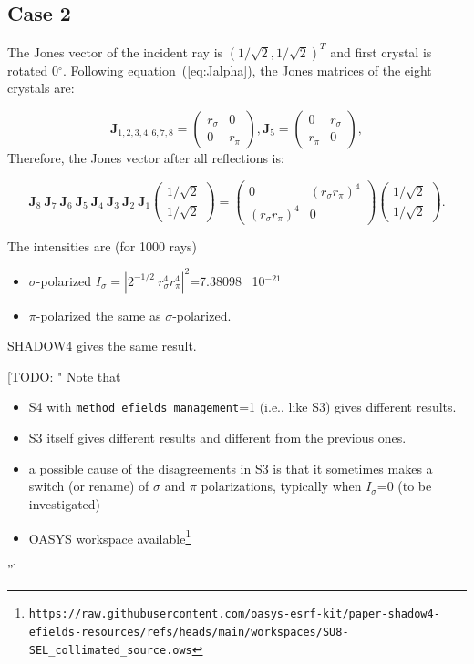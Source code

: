 \documentclass{iucr}
\newcommand{\todo}[1]{{\color{red}[TODO: "#1'']}}
\begin{document}
\subsection{Case 2}
The Jones vector of the incident ray is $(1/\sqrt{2},1/\sqrt{2})^T$ and first crystal is rotated 0$^\circ$. Following equation~(\ref{eq:Jalpha}), the Jones matrices of the eight crystals are: 

\begin{equation}\label{eq:Jcase2}
\textbf{J}_{1,2,3,4,6,7,8}=
    \begin{pmatrix}
r_\sigma & 0\\
0& 
r_\pi
\end{pmatrix},
\textbf{J}_{5}=
    \begin{pmatrix}
0 & r_\sigma\\ 
r_\pi & 0\end{pmatrix},
\end{equation}
Therefore, the Jones vector after all reflections is:

\begin{equation}\label{eq:JVcase2}
\textbf{J}_8~\textbf{J}_7~\textbf{J}_6~\textbf{J}_5~\textbf{J}_4~\textbf{J}_3~\textbf{J}_2~\textbf{J}_1
    \begin{pmatrix}
    1/\sqrt{2}\\1/\sqrt{2}
    \end{pmatrix}=
\begin{pmatrix}
  0 & (r_\sigma r_\pi)^4 \\
  (r_\sigma r_\pi)^4 & 0
\end{pmatrix}    \begin{pmatrix}
    1/\sqrt{2}\\1/\sqrt{2}
    \end{pmatrix}.
\end{equation}

The intensities are (for 1000 rays)
\begin{itemize}
    \item $\sigma$-polarized $I_\sigma=|2^{-1/2}~r_\sigma^4 r_\pi^4|^2$=7.38098~ 10$^{-21}$
    \item $\pi$-polarized the same as $\sigma$-polarized.
\end{itemize}

SHADOW4 gives the same result.

\todo{
Note that 
\begin{itemize}
    \item S4 with {\tt method\_efields\_management}=1 (i.e., like S3) gives different results. 
    \item S3 itself gives different results and different from the previous ones.
    \item a possible cause of the disagreements in S3 is that it sometimes makes a switch (or rename) of $\sigma$ and $\pi$ polarizations, typically when $I_\sigma$=0 (to be investigated)
    \item OASYS workspace available\footnote{ \tiny {\tt https://raw.githubusercontent.com/oasys-esrf-kit/paper-shadow4-efields-resources/refs/heads/main/workspaces/SU8-SEL\_collimated\_source.ows}} 
\end{itemize}
}
\end{document}
